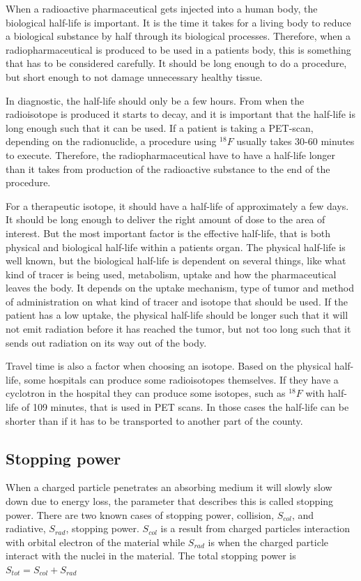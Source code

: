 \documentclass[twoside,english]{uiofysmaster/uiofysmaster}
\begin{document}
When a radioactive pharmaceutical gets injected into a human body, the biological half-life is important. It is the time it takes for a living body to reduce a biological substance by half through its biological processes. Therefore, when a radiopharmaceutical is produced to be used in a patients body, this is something that has to be considered carefully. It should be long enough to do a procedure, but short enough to not damage unnecessary healthy tissue. 

In diagnostic, the half-life should only be a few hours. From when the radioisotope is produced it starts to decay, and it is important that the half-life is long enough such that it can be used. If a patient is taking a PET-scan, depending on the radionuclide, a procedure using $^{18}F$ usually takes 30-60 minutes to execute. Therefore, the radiopharmaceutical have to have a half-life longer than it takes from production of the radioactive substance to the end of the procedure.


For a therapeutic isotope, it should have a half-life of approximately a few days. It should be long enough to deliver the right amount of dose to the area of interest. But the most important factor is the effective half-life, that is both physical and biological half-life within a patients organ\cite{Yeong}. The physical half-life is well known, but the biological half-life is dependent on several things, like what kind of tracer is being used, metabolism, uptake and how the pharmaceutical leaves the body\cite{Yeong}.
It depends on the uptake mechanism, type of tumor and method of administration\cite{Yeong} on what kind of tracer and isotope that should be used. If the patient has a low uptake, the physical half-life should be longer such that it will not emit radiation before it has reached the tumor, but not too long such that it sends out radiation on its way out of the body. 


Travel time is also a factor when choosing an isotope. Based on the physical half-life, some hospitals can produce some radioisotopes themselves. If they have a cyclotron in the hospital they can produce some isotopes, such as $^{18}F$ with half-life of 109 minutes, that is used in PET scans. In those cases the half-life can be shorter than if it has to be transported to another part of the county. 


\subsection{Stopping power}
When a charged particle penetrates an absorbing medium it will slowly slow down due to energy loss, the parameter that describes this is called stopping power. There are two known cases of stopping power\cite{Nuclear_medicine}, collision, $S_{col}$, and radiative, $S_{rad}$, stopping power. $S_{col}$ is a result from charged particles interaction with orbital electron of the material while $S_{rad}$ is when the charged particle interact with the nuclei in the material. The total stopping power is $S_{tot} = S_{col} + S_{rad}$ 
\end{document}
